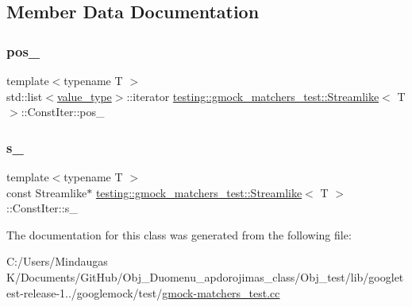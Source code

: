 \subsection{Member Data Documentation}
\mbox{\label{classtesting_1_1gmock__matchers__test_1_1_streamlike_1_1_const_iter_a829a92cb79cc5c30841552385c609f82}} 
\subsubsection{\texorpdfstring{pos\_}{pos\_}}
{\footnotesize\ttfamily template$<$typename T $>$ \\
std\+::list$<$\mbox{\hyperlink{classtesting_1_1gmock__matchers__test_1_1_streamlike_a7e2c2e021676c1ed5dea63cdd019661c}{value\+\_\+type}}$>$\+::iterator \mbox{\hyperlink{classtesting_1_1gmock__matchers__test_1_1_streamlike}{testing\+::gmock\+\_\+matchers\+\_\+test\+::\+Streamlike}}$<$ T $>$\+::Const\+Iter\+::pos\+\_\+\hspace{0.3cm}{\ttfamily [private]}}

\mbox{\label{classtesting_1_1gmock__matchers__test_1_1_streamlike_1_1_const_iter_a159a45a0271c596ad01ae70d9a5be69d}} 
\subsubsection{\texorpdfstring{s\_}{s\_}}
{\footnotesize\ttfamily template$<$typename T $>$ \\
const Streamlike$\ast$ \mbox{\hyperlink{classtesting_1_1gmock__matchers__test_1_1_streamlike}{testing\+::gmock\+\_\+matchers\+\_\+test\+::\+Streamlike}}$<$ T $>$\+::Const\+Iter\+::s\+\_\+\hspace{0.3cm}{\ttfamily [private]}}



The documentation for this class was generated from the following file\+:\begin{DoxyCompactItemize}
\item 
C\+:/\+Users/\+Mindaugas K/\+Documents/\+Git\+Hub/\+Obj\+\_\+\+Duomenu\+\_\+apdorojimas\+\_\+class/\+Obj\+\_\+test/lib/googletest-\/release-\/1../googlemock/test/\mbox{\hyperlink{_obj__test_2lib_2googletest-release-1_88_81_2googlemock_2test_2gmock-matchers__test_8cc}{gmock-\/matchers\+\_\+test.\+cc}}\end{DoxyCompactItemize}
